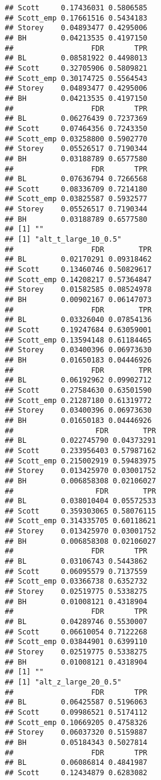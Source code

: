 \documentclass{article}\usepackage[]{graphicx}\usepackage[]{color}
\makeatletter
\newenvironment{kframe}{%
 \def\at@end@of@kframe{}%
 \ifinner\ifhmode%
  \def\at@end@of@kframe{\end{minipage}}%
  \begin{minipage}{\columnwidth}%
 \fi\fi%
 \def\FrameCommand##1{\hskip\@totalleftmargin \hskip-\fboxsep
 \colorbox{shadecolor}{##1}\hskip-\fboxsep
     \hskip-\linewidth \hskip-\@totalleftmargin \hskip\columnwidth}%
 \MakeFramed {\advance\hsize-\width
   \@totalleftmargin\z@ \linewidth\hsize
   \@setminipage}}%
 {\par\unskip\endMakeFramed%
 \at@end@of@kframe}
\newenvironment{knitrout}{}{} %
\makeatother
\begin{document}
\begin{knitrout}
\begin{kframe}
\begin{verbatim}
## Scott     0.17436031 0.5806585
## Scott_emp 0.17661516 0.5434183
## Storey    0.04893477 0.4295006
## BH        0.04213535 0.4197150
##                  FDR       TPR
## BL        0.08581922 0.4498013
## Scott     0.32705906 0.5809821
## Scott_emp 0.30174725 0.5564543
## Storey    0.04893477 0.4295006
## BH        0.04213535 0.4197150
##                  FDR       TPR
## BL        0.06276439 0.7237369
## Scott     0.07464356 0.7243350
## Scott_emp 0.03258800 0.5902770
## Storey    0.05526517 0.7190344
## BH        0.03188789 0.6577580
##                  FDR       TPR
## BL        0.07636794 0.7266568
## Scott     0.08336709 0.7214180
## Scott_emp 0.03825587 0.5932577
## Storey    0.05526517 0.7190344
## BH        0.03188789 0.6577580
## [1] ""
## [1] "alt_t_large_10_0.5"
##                  FDR        TPR
## BL        0.02170291 0.09318462
## Scott     0.13460746 0.50829617
## Scott_emp 0.14208217 0.57364847
## Storey    0.01582585 0.08524978
## BH        0.00902167 0.06147073
##                  FDR        TPR
## BL        0.03326040 0.07854136
## Scott     0.19247684 0.63059001
## Scott_emp 0.13594148 0.61184465
## Storey    0.03400396 0.06973630
## BH        0.01650183 0.04446926
##                  FDR        TPR
## BL        0.06192962 0.09902712
## Scott     0.27584630 0.63501590
## Scott_emp 0.21287180 0.61319772
## Storey    0.03400396 0.06973630
## BH        0.01650183 0.04446926
##                   FDR        TPR
## BL        0.022745790 0.04373291
## Scott     0.233956403 0.57987162
## Scott_emp 0.215002919 0.59483975
## Storey    0.013425970 0.03001752
## BH        0.006858308 0.02106027
##                   FDR        TPR
## BL        0.038010404 0.05572533
## Scott     0.359303065 0.58076115
## Scott_emp 0.314335705 0.60118621
## Storey    0.013425970 0.03001752
## BH        0.006858308 0.02106027
##                  FDR       TPR
## BL        0.03106743 0.5443862
## Scott     0.06095579 0.7137559
## Scott_emp 0.03366738 0.6352732
## Storey    0.02519775 0.5338275
## BH        0.01008121 0.4318904
##                  FDR       TPR
## BL        0.04289746 0.5530007
## Scott     0.06610054 0.7122268
## Scott_emp 0.03844901 0.6399110
## Storey    0.02519775 0.5338275
## BH        0.01008121 0.4318904
## [1] ""
## [1] "alt_z_large_20_0.5"
##                  FDR       TPR
## BL        0.06425587 0.5196063
## Scott     0.09986521 0.5174112
## Scott_emp 0.10669205 0.4758326
## Storey    0.06037320 0.5159887
## BH        0.05184343 0.5027814
##                  FDR       TPR
## BL        0.06086814 0.4841987
## Scott     0.12434879 0.6283082

\end{verbatim}
\end{kframe}
\end{knitrout}
\end{document}
